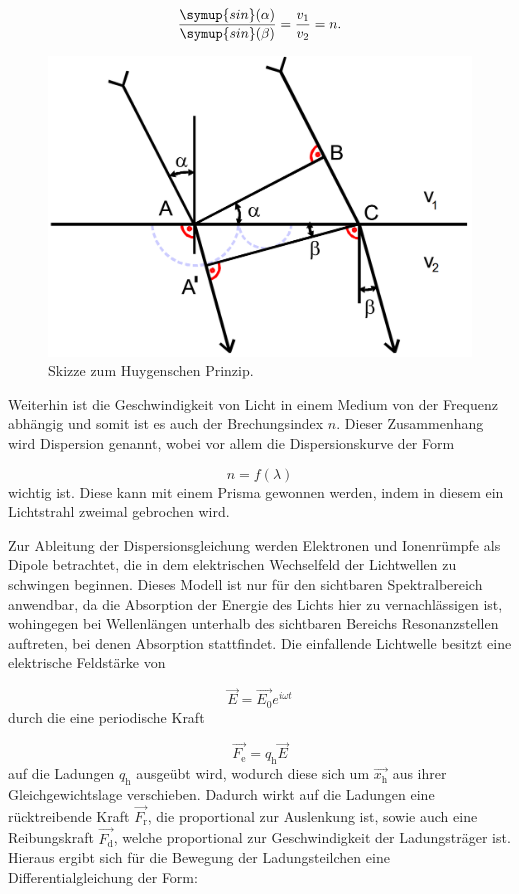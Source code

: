 \begin{equation}
\frac{\symup{sin}(\alpha)}{\symup{sin}(\beta)} = \frac{v_1}{v_2} = n.
\end{equation}

\begin{figure}[h!tbp]
	\centering
	\includegraphics[width=0.6\linewidth]{hyugens.png}
	\caption{Skizze zum Huygenschen Prinzip.\cite[2]{anleitung402}}
	\label{fig:huygens}
\end{figure}


Weiterhin ist die Geschwindigkeit von Licht in einem Medium von der Frequenz abhängig und somit ist es auch der Brechungsindex $n$. Dieser Zusammenhang wird Dispersion genannt, wobei vor allem die Dispersionskurve der Form 

\begin{equation}
n = f(\lambda)
\end{equation}
wichtig ist. Diese kann mit einem Prisma  gewonnen werden, indem in diesem ein Lichtstrahl zweimal gebrochen wird. 

Zur Ableitung der Dispersionsgleichung werden Elektronen und Ionenrümpfe als Dipole betrachtet, die in dem elektrischen Wechselfeld der Lichtwellen zu schwingen beginnen. Dieses Modell ist nur für den sichtbaren Spektralbereich anwendbar, da die Absorption der Energie des Lichts hier zu vernachlässigen ist,
wohingegen bei Wellenlängen unterhalb des sichtbaren Bereichs Resonanzstellen auftreten, bei denen Absorption stattfindet.
Die einfallende Lichtwelle besitzt eine elektrische Feldstärke von

\begin{equation}
\vec{E} = \vec{E_0} e^{i\omega t}
\end{equation}
durch die eine periodische Kraft

\begin{equation}
\vec{F_{\text{e}}} = q_{\text{h}} \vec{E}
\end{equation}
auf die Ladungen $q_{\text{h}}$ ausgeübt wird, wodurch diese sich um $\vec{x_{\text{h}}}$ aus ihrer Gleichgewichtslage verschieben. Dadurch wirkt auf die Ladungen eine rücktreibende Kraft $\vec{F_{\text{r}}}$, die proportional zur Auslenkung ist, sowie auch eine Reibungskraft $\vec{F_{\text{d}}}$, welche
proportional zur Geschwindigkeit der Ladungsträger ist.
Hieraus ergibt sich für die Bewegung der Ladungsteilchen eine Differentialgleichung der Form:

